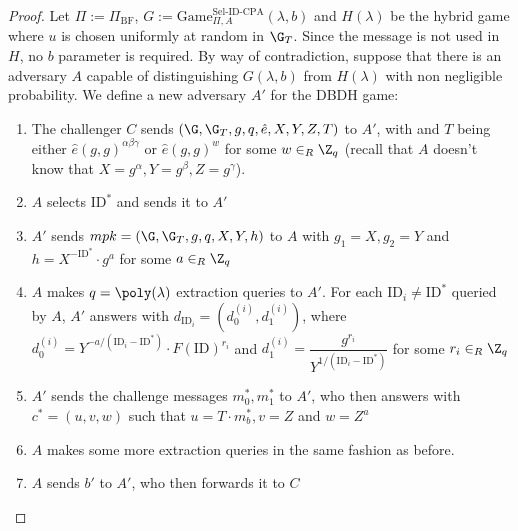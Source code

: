 \documentclass[a4paper, 12pt]{report}
\begin{document}
    \begin{proof}
        Let $\Pi := \Pi_{\mathrm{BF}}$, $G := \mathrm{Game}^{\text{Sel-ID-CPA}}_{\Pi, A}(\lambda, b)$ and $H(\lambda)$ be the hybrid game where $u$ is chosen uniformly at random in $\G_T$. Since the message is not used in $H$, no $b$ parameter is required. By way of contradiction, suppose that there is an adversary $A$ capable of distinguishing $G(\lambda, b)$ from $H(\lambda)$ with non negligible probability. We define a new adversary $A'$ for the DBDH game:
        \begin{enumerate}
            \item The challenger $C$ sends $(\G,\G_T,g,q, \hat e, X, Y, Z, T)$ to $A'$, with  and $T$ being either $\hat e(g,g)^{\alpha\beta\gamma}$ or $\hat e(g, g)^w$ for some $w \in_R \Z_q$ (recall that $A$ doesn't know that $X=g^\alpha, Y = g^{\beta}, Z = g^{\gamma}$).
            
            \item $A$ selects $\mathrm{ID}^*$ and sends it to $A'$
            \item $A'$ sends $mpk = (\G, \G_T, g, q, X, Y, h)$ to $A$ with $g_1 = X, g_2 = Y$ and $h = X^{-\mathrm{ID}^*} \cdot g^{a}$ for some $a \in_R \Z_q$
            \item $A$ makes $q = \poly(\lambda)$ extraction queries to $A'$. For each $\mathrm{ID}_i \neq \mathrm{ID}^*$ queried by $A$, $A'$ answers with $d_{\mathrm{ID}_i} = (d_0^{(i)}, d_1^{(i)})$, where $d_0^{(i)} = Y^{-a/(\mathrm{ID}_i-\mathrm{ID}^*)} \cdot F(\mathrm{ID})^{r_i}$ and $d_1^{(i)} = \dfrac{g^{r_i}}{Y^{1/(\mathrm{ID}_i-\mathrm{ID}^*)}}$ for some $r_i \in_R \Z_q$
            \item $A'$ sends the challenge messages $m_0^*, m_1^*$ to $A'$, who then answers with $c^* = (u,v,w)$ such that $u = T \cdot m_b^*, v =Z$ and $w = Z^{a}$
            \item $A$ makes some more extraction queries in the same fashion as before.
            \item $A$ sends $b'$ to $A'$, who then forwards it to $C$
        \end{enumerate}


\end{proof}
\end{document}

